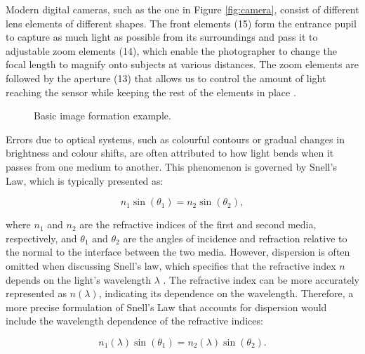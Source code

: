 Modern digital cameras, such as the one in Figure \ref{fig:camera}, consist of different lens elements of different shapes. The front elements (15) form the entrance pupil to capture as much light as possible from its surroundings and pass it to adjustable zoom elements (14), which enable the photographer to change the focal length to magnify onto subjects at various distances. The zoom elements are followed by the aperture (13) that allows us to control the amount of light reaching the sensor while keeping the rest of the elements in place \cite[159-239]{Hecht}.



\begin{figure}
\centering

\caption{Basic image formation example.}
\label{fig:optics}
\end{figure}

Errors due to optical systems, such as colourful contours or gradual changes in brightness and colour shifts, are often attributed to how light bends when it passes from one medium to another. This phenomenon is governed by Snell's Law, which is typically presented as:

\begin{equation}
\label{eq:snell_revised}
n_1 \sin(\theta_1) = n_2 \sin(\theta_2),
\end{equation}

where $n_1$ and $n_2$ are the refractive indices of the first and second media, respectively, and $\theta_1$ and $\theta_2$ are the angles of incidence and refraction relative to the normal to the interface between the two media. However, dispersion is often omitted when discussing Snell's law, which specifies that the refractive index $n$ depends on the light's wavelength $\lambda$  \cite[108-109]{Hecht}. The refractive index can be more accurately represented as $n(\lambda)$, indicating its dependence on the wavelength. Therefore, a more precise formulation of Snell's Law that accounts for dispersion would include the wavelength dependence of the refractive indices:

\begin{equation}
\label{eq:snell_wavelength}
n_1(\lambda) \sin(\theta_1) = n_2(\lambda) \sin(\theta_2).
\end{equation}


